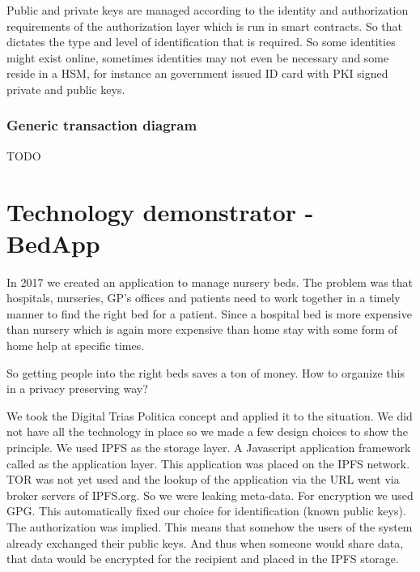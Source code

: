 \documentclass{article}
\begin{document}
Public and private keys are managed according to the identity and authorization requirements of the authorization layer which is run in smart contracts. So that dictates the type and level of identification that is required. So some identities might exist online, sometimes identities may not even be necessary and some reside in a HSM, for instance an government issued ID card with PKI signed private and public keys. 


\subsubsection{Generic transaction diagram}
TODO

\section{Technology demonstrator - BedApp}
In 2017 we created an application to manage nursery beds. The problem was that hospitals, nurseries, GP's offices and patients need to work together in a timely manner to find the right bed for a patient. Since a hospital bed is more expensive than nursery which is again more expensive than home stay with some form of home help at specific times.

So getting people into the right beds saves a ton of money. How to organize this in a privacy preserving way?

We took the Digital Trias Politica concept and applied it to the situation. We did not have all the technology in place so we made a few design choices to show the principle. We used IPFS as the storage layer. A Javascript application framework called  as the application layer. This application was placed on the IPFS network. TOR was not yet used and the lookup of the application via the URL went via broker servers of IPFS.org. So we were leaking meta-data. For encryption we used GPG. This automatically fixed our choice for identification (known public keys). The authorization was implied. This means that somehow the users of the system already exchanged their public keys. And thus when someone would share data, that data would be encrypted for the recipient and placed in the IPFS storage.
\end{document}
